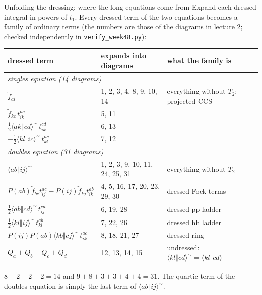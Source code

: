 \documentclass[aspectratio=169,10pt]{beamer}
\newcommand{\as}[4]{\langle #1#2\Vert #3#4\rangle}
\newcommand{\ft}{\tilde f}
\newcommand{\vt}[4]{\langle #1#2\Vert #3#4\rangle^{\sim}}
\begin{document}
\begin{frame}[shrink=19]{Unfolding the dressing: where the long equations come from}
\small
Expand each dressed integral in powers of $t_1$. Every dressed term of the two equations becomes a family of ordinary terms (the numbers are those of the diagrams in lecture 2; checked independently in \texttt{verify\_week48.py}):
\begin{center}
\renewcommand{\arraystretch}{1.25}
\begin{tabular}{lll}
\toprule
dressed term & expands into diagrams & what the family is\\
\midrule
\multicolumn{3}{l}{\emph{singles equation (14 diagrams)}}\\
$\ft_{ai}$ & 1, 2, 3, 4, 8, 9, 10, 14 & everything without $T_2$: projected CCS\\
$\ft_{kc}\,t_{ik}^{ac}$ & 5, 11 & \\
$\tfrac12\vt akcd\,t_{ik}^{cd}$ & 6, 13 & \\
$-\tfrac12\vt klic\,t_{kl}^{ac}$ & 7, 12 & \\
\midrule
\multicolumn{3}{l}{\emph{doubles equation (31 diagrams)}}\\
$\vt abij$ & 1, 2, 3, 9, 10, 11, 24, 25, 31 & everything without $T_2$\\
$P(ab)\ft_{bc}t_{ij}^{ac}-P(ij)\ft_{kj}t_{ik}^{ab}$ & 4, 5, 16, 17, 20, 23, 29, 30 & dressed Fock terms\\
$\tfrac12\vt abcd\,t_{ij}^{cd}$ & 6, 19, 28 & dressed pp ladder\\
$\tfrac12\vt klij\,t_{kl}^{ab}$ & 7, 22, 26 & dressed hh ladder\\
$P(ij)P(ab)\vt kbcj\,t_{ik}^{ac}$ & 8, 18, 21, 27 & dressed ring\\
$Q_a+Q_b+Q_c+Q_d$ & 12, 13, 14, 15 & undressed: $\vt klcd=\as klcd$\\
\bottomrule
\end{tabular}
\end{center}
$8+2+2+2=14$ and $9+8+3+3+4+4=31$. The quartic term of the doubles equation is simply the last term of $\vt abij$.
\end{frame}
\end{document}
